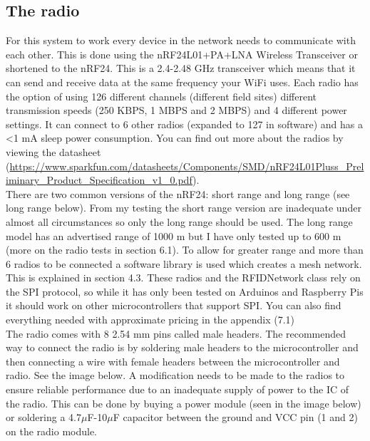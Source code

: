 \documentclass[12pt]{article}
\begin{document}
\subsection{The radio}
For this system to work every device in the network needs to communicate with each other.  This is done using the nRF24L01+PA+LNA Wireless Transceiver or shortened to the nRF24.  This is a 2.4-2.48 GHz transceiver which means that it can send and receive data at the same frequency your WiFi uses.  Each radio has the option of using 126 different channels (different field sites) different transmission speeds (250 KBPS, 1 MBPS and 2 MBPS) and 4 different power settings.  It can connect to 6 other radios (expanded to 127 in software) and has a \textless 1 mA sleep power consumption.  You can find out more about the radios by viewing the datasheet (\url{https://www.sparkfun.com/datasheets/Components/SMD/nRF24L01Pluss_Preliminary_Product_Specification_v1_0.pdf}).\\
There are two common versions of the nRF24: short range and long range (see long range below).  From my testing the short range version are inadequate under almost all circumstances so only the long range should be used.  The long range model has an advertised range of 1000 m but I have only tested up to 600 m (more on the radio tests in section 6.1).  To allow for greater range and more than 6 radios to be connected a software library is used which creates a mesh network.  This is explained in section 4.3.  These radios and the RFIDNetwork class rely on the SPI protocol, so while it has only been tested on Arduinos and Raspberry Pis it should work on other microcontrollers that support SPI. You can also find everything needed with approximate pricing in the appendix (7.1)\\
The radio comes with 8 2.54 mm pins called male headers.  The recommended way to connect the radio is by soldering male headers to the microcontroller and then connecting a wire with female headers between the microcontroller and radio.  See the image below.  A modification needs to be made to the radios to ensure reliable performance due to an inadequate supply of power to the IC of the radio.  This can be done by buying a power module (seen in the image below) or soldering a 4.7$\mu$F-10$\mu$F capacitor between the ground and VCC pin (1 and 2) on the radio module.\\
\end{document}
